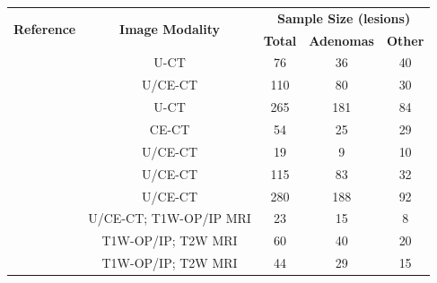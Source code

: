 \documentclass[11pt]{article}
\begin{document}
\begin{table}[]
    \centering
    \begin{tabular}{ccccc}\toprule
        \multirow{2}{*}{\textbf{Reference}} & \multirow{2}{*}{\textbf{Image Modality}} & \multicolumn{3}{c}{\textbf{Sample Size (lesions)}}
        \\\cmidrule(lr){3-5}
                                            &                                          & \textbf{Total}                                     & \textbf{Adenomas} & \textbf{Other} \\\midrule
        \cite{Tu2018}                       & U-CT                                     & 76                                                 & 36                & 40             \\
        \cite{Yi20181}                      & U/CE-CT                                  & 110                                                & 80                & 30             \\
        \cite{Yi2018}                       & U-CT                                     & 265                                                & 181               & 84             \\
        \cite{Elmohr2019}                   & CE-CT                                    & 54                                                 & 25                & 29             \\
        \cite{Torresan2021}                 & U/CE-CT                                  & 19                                                 & 9                 & 10             \\
        \cite{Kusunoki2022}                 & U/CE-CT                                  & 115                                                & 83                & 32             \\
        \cite{Liu2022}                      & U/CE-CT                                  & 280                                                & 188               & 92             \\
        \cite{Ho2019}                       & U/CE-CT; T1W-OP/IP MRI                   & 23                                                 & 15                & 8              \\
        \cite{Liu2021}                      & T1W-OP/IP; T2W MRI                       & 60                                                 & 40                & 20             \\
        \cite{Schieda2017}                  & T1W-OP/IP; T2W MRI                       & 44                                                 & 29                & 15             \\

\end{tabular}
\end{table}
\end{document}

